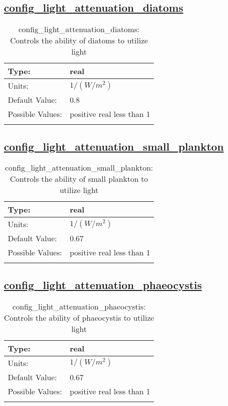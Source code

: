 \subsection[config\_light\_attenuation\_diatoms]{\hyperref[sec:nm_tab_biogeochemistry]{config\_light\_attenuation\_diatoms}}
\label{subsec:nm_sec_config_light_attenuation_diatoms}
\begin{center}
\begin{longtable}{| p{2.0in} || p{4.0in} |}
    \hline
    Type: & real \\
    \hline
    Units: & $1/(W/m^2)$ \\
    \hline
    Default Value: & 0.8 \\
    \hline
    Possible Values: & positive real less than 1 \\
    \hline
    \caption{config\_light\_attenuation\_diatoms: Controls the ability of diatoms to utilize light}
\end{longtable}
\end{center}
\subsection[config\_light\_attenuation\_small\_plankton]{\hyperref[sec:nm_tab_biogeochemistry]{config\_light\_attenuation\_small\_plankton}}
\label{subsec:nm_sec_config_light_attenuation_small_plankton}
\begin{center}
\begin{longtable}{| p{2.0in} || p{4.0in} |}
    \hline
    Type: & real \\
    \hline
    Units: & $1/(W/m^2)$ \\
    \hline
    Default Value: & 0.67 \\
    \hline
    Possible Values: & positive real less than 1 \\
    \hline
    \caption{config\_light\_attenuation\_small\_plankton: Controls the ability of small plankton to utilize light}
\end{longtable}
\end{center}
\subsection[config\_light\_attenuation\_phaeocystis]{\hyperref[sec:nm_tab_biogeochemistry]{config\_light\_attenuation\_phaeocystis}}
\label{subsec:nm_sec_config_light_attenuation_phaeocystis}
\begin{center}
\begin{longtable}{| p{2.0in} || p{4.0in} |}
    \hline
    Type: & real \\
    \hline
    Units: & $1/(W/m^2)$ \\
    \hline
    Default Value: & 0.67 \\
    \hline
    Possible Values: & positive real less than 1 \\
    \hline
    \caption{config\_light\_attenuation\_phaeocystis: Controls the ability of phaeocystis to utilize light}
\end{longtable}
\end{center}

